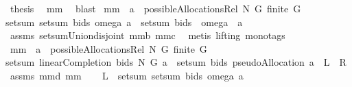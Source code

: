\begin{isabellebody}
\ {\isacharquery}thesis\ \isamarkupfalse%
\ mm{}{}\ \isamarkupfalse%
\ blast\isanewline
{}\isamarkupfalse%
%
\endisatagproof
{\isafoldproof}%
%
\isadelimproof
\isanewline
%
\endisadelimproof
\isanewline
{}\isamarkupfalse%
\ mm{}{}{\isacharcolon}\ \ {\isachardoublequoteopen}a\ {\isasymin}\ possibleAllocationsRel\ N\ G{\isachardoublequoteclose}\ {\isachardoublequoteopen}finite\ G{\isachardoublequoteclose}\ \ \isanewline
{\isachardoublequoteopen}setsum\ {\isacharparenleft}setsum\ bids{\isacharparenright}\ {\isacharparenleft}omega{\isacharbackquote}\ a{\isacharparenright}\ {\isacharequal}\ setsum\ bids\ {\isacharparenleft}{\isasymUnion}\ {\isacharparenleft}omega\ {\isacharbackquote}\ a{\isacharparenright}{\isacharparenright}\ {\isachardoublequoteclose}\ \isanewline
%
\isadelimproof
%
\endisadelimproof
%
\isatagproof
{}\isamarkupfalse%
\ assms\ setsum{\isacharunderscore}Union{\isacharunderscore}disjoint{\isacharunderscore}{}\ mm{}{}b\ mm{}{}c\ \isamarkupfalse%
\ {\isacharparenleft}metis\ {\isacharparenleft}lifting{\isacharcomma}\ mono{\isacharunderscore}tags{\isacharparenright}{\isacharparenright}%
\endisatagproof
{\isafoldproof}%
%
\isadelimproof
\isanewline
%
\endisadelimproof
\isanewline
{}\isamarkupfalse%
\ mm{}{}{\isacharcolon}\ \ {\isachardoublequoteopen}a\ {\isasymin}\ possibleAllocationsRel\ N\ G{\isachardoublequoteclose}\ {\isachardoublequoteopen}finite\ G{\isachardoublequoteclose}\ \ \isanewline
{\isachardoublequoteopen}setsum\ {\isacharparenleft}linearCompletion{\isacharprime}\ bids\ N\ G{\isacharparenright}\ a\ {\isacharequal}\ setsum\ bids\ {\isacharparenleft}pseudoAllocation\ a{\isacharparenright}{\isachardoublequoteclose}\ {\isacharparenleft}\ {\isachardoublequoteopen}{\isacharquery}L\ {\isacharequal}\ {\isacharquery}R{\isachardoublequoteclose}{\isacharparenright}\isanewline
%
\isadelimproof
%
\endisadelimproof
%
\isatagproof
{}\isamarkupfalse%
\ assms\ mm{}{}d\ mm{}{}\ \isanewline
{}\isamarkupfalse%
\ {\isacharminus}\isanewline
{}\isamarkupfalse%
\ {\isachardoublequoteopen}{\isacharquery}L\ {\isacharequal}\ setsum\ {\isacharparenleft}setsum\ bids{\isacharparenright}\ {\isacharparenleft}omega\ {\isacharbackquote}a{\isacharparenright}{\isachardoublequoteclose}\ \isamarkupfalse%

\end{isabellebody}

